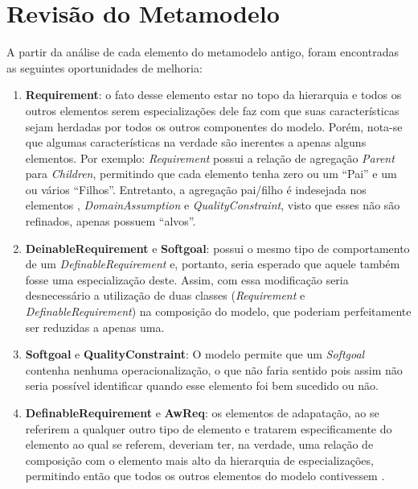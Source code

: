 
\section{Revisão do Metamodelo}
\label{sec-zanshin-revisao}
A partir da análise de cada elemento do metamodelo antigo, foram encontradas as seguintes oportunidades de melhoria:

\begin{enumerate}
	\item \textbf{Requirement}: o fato desse elemento estar no topo da hierarquia e todos os outros elementos serem especializações dele faz com que suas características sejam herdadas por todos os outros componentes do modelo. Porém, nota-se que algumas características na verdade são inerentes a apenas alguns elementos. Por exemplo: \textit{Requirement} possui a relação de agregação \textit{Parent} para \textit{Children}, permitindo que cada elemento tenha zero ou um ``Pai'' e um ou vários ``Filhos''. Entretanto, a agregação pai/filho é indesejada nos elementos \awreq, \textit{DomainAssumption} e \textit{QualityConstraint}, visto que esses não são refinados, apenas possuem ``alvos''. \label{p1}
	
	\item \textbf{DeinableRequirement} e \textbf{Softgoal}: \sofgoal possui o mesmo tipo de comportamento de um \textit{DefinableRequirement} e, portanto, seria esperado que aquele também fosse uma especialização deste. Assim, com essa modificação seria desnecessário a utilização de duas classes (\textit{Requirement} e \textit{DefinableRequirement}) na composição do modelo, que poderiam perfeitamente ser reduzidas a apenas uma. \label{p2}
	
	\item \textbf{Softgoal} e \textbf{QualityConstraint}: O modelo permite que um \textit{Softgoal} contenha nenhuma operacionalização, o que não faria sentido pois assim não seria possível identificar quando esse elemento foi bem sucedido ou não. \label{p3}
	
	\item \textbf{DefinableRequirement} e \textbf{AwReq}: os elementos de adapatação, ao se referirem a qualquer outro tipo de elemento e tratarem especificamente do elemento ao qual se referem, deveriam ter, na verdade, uma relação de composição com o elemento mais alto da hierarquia de especializações, permitindo então que todos os outros elementos do modelo contivessem \awreqs. \label{p4}
	

\end{enumerate}
